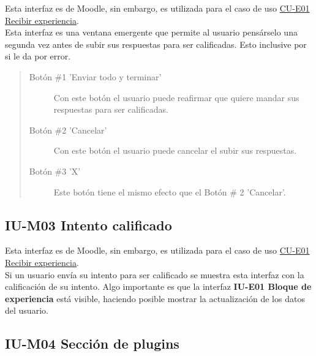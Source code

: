     Esta interfaz es de Moodle, sin embargo, es utilizada para el caso de uso  \hyperref[CU-E01]{CU-E01 Recibir experiencia}.\\

    \noindent Esta interfaz es una ventana emergente que permite al usuario pensárselo una segunda vez antes de subir sus respuestas para ser calificadas. Esto inclusive por si le da por error.\\


    \begin{quote}
    \begin{description}
    	\item[Botón \#1 'Enviar todo y terminar'] Con este botón el usuario puede reafirmar que quiere mandar sus respuestas para ser calificadas.
    	\item[Botón \#2 'Cancelar'] Con este botón el usuario puede cancelar el subir sus respuestas.
    	\item[Botón \#3 'X'] Este botón tiene el mismo efecto que el Botón \# 2 'Cancelar'.
    \end{description}
    \end{quote}
	\clearpage

\subsection*{IU-M03 Intento calificado}
\label{IUM03}

    Esta interfaz es de Moodle, sin embargo, es utilizada para el caso de uso   \hyperref[CU-E01]{CU-E01 Recibir experiencia}.\\

    \noindent Si un usuario envía su intento para ser calificado
    se muestra esta interfaz con la calificación de su intento. Algo importante es que la interfaz  \textbf{IU-E01 Bloque de experiencia} está visible, haciendo posible mostrar la actualización de los datos del usuario.\\



	\clearpage

\subsection*{IU-M04 Sección de plugins}
\label{IUM04}

